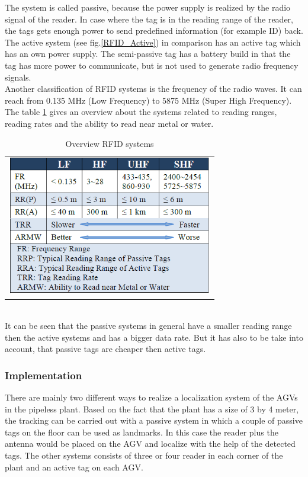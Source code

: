 The system is called passive, because the power supply is realized by the radio signal of the reader. In case where the tag is in the reading range of the reader, the tags gets enough power to send predefined information (for example ID) back. The active system (see fig.\ref{RFID_Active}) in comparison has an active tag which has an own power supply. The semi-passive tag has a battery build in that the tag has more power to communicate, but is not used to generate radio frequency signals.\\ 
Another classification of RFID systems is the frequency of the radio waves. It can reach from 0.135 MHz (Low Frequency) to 5875 MHz (Super High Frequency). The table \ref{RFID_Systems} gives an overview about the systems related to reading ranges, reading rates and the ability to read near metal or water.\\
\begin{table}[!htbp]
\centering
\begin{tabular}{c}
\includegraphics[width = 9cm]{Pictures/RFID_Systems}
\end{tabular}
\caption{Overview RFID systems}
\label{RFID_Systems}
\end{table}\\
It can be seen that the passive systems in general have a smaller reading range then the active systems and has a bigger data rate. But it has also to be take into account, that passive tags are cheaper then active tags.   
\subsubsection*{Implementation}
There are mainly two different ways to realize a localization system of the AGVs in the pipeless plant. Based on the fact that the plant has a size of 3 by 4 meter, the tracking can be carried out with a passive system in which a couple of passive tags on the floor can be used as landmarks. In this case the reader plus the antenna would be placed on the AGV and localize with the help of the detected tags. The other systems consists of three or four reader in each corner of the plant and an active tag on each AGV.
\pagebreak
